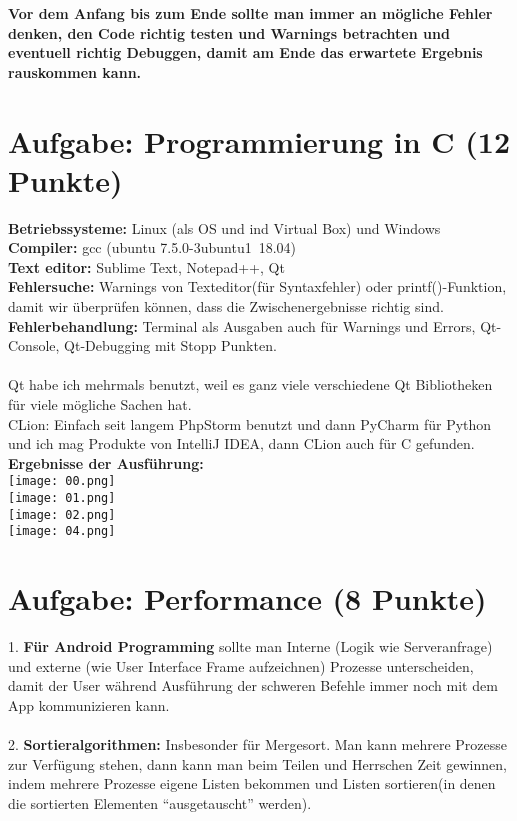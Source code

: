  \textbf{Vor dem Anfang bis zum Ende sollte man immer an mögliche Fehler denken, den Code richtig testen und Warnings betrachten und eventuell richtig Debuggen, damit am Ende das erwartete Ergebnis rauskommen kann.}


\section{Aufgabe: Programmierung in C \hfill (12 Punkte)}
 \textbf{Betriebssysteme:} Linux (als OS und ind Virtual Box) und Windows\\
 \textbf{Compiler:} gcc (ubuntu 7.5.0-3ubuntu1~18.04)\\ 
 \textbf{Text editor:} Sublime Text, Notepad++, Qt\\
 \textbf{Fehlersuche:} Warnings von Texteditor(für Syntaxfehler) oder printf()-Funktion, damit wir überprüfen können, dass die Zwischenergebnisse richtig sind. \\
 \textbf{Fehlerbehandlung:} Terminal als Ausgaben auch für Warnings und Errors, Qt-Console, Qt-Debugging mit Stopp Punkten.\\\\

Qt habe ich mehrmals benutzt, weil es ganz viele verschiedene Qt Bibliotheken für viele mögliche Sachen hat.\\
CLion: Einfach seit langem PhpStorm benutzt und dann PyCharm für Python und ich mag Produkte von IntelliJ IDEA, dann CLion auch für C gefunden.\\

\textbf{Ergebnisse der Ausführung:}\\
\texttt{[image: 00.png]}\\
\texttt{[image: 01.png]}\\
\texttt{[image: 02.png]}\\
\texttt{[image: 04.png]}\\


\section{Aufgabe: Performance \hfill (8 Punkte)}
1. \textbf{Für Android Programming} sollte man Interne (Logik wie Serveranfrage) und externe (wie User Interface Frame aufzeichnen) Prozesse unterscheiden, damit der User während Ausführung der schweren Befehle immer noch mit dem App kommunizieren kann.\\\\
2. \textbf{Sortieralgorithmen:} Insbesonder für Mergesort. Man kann mehrere Prozesse zur Verfügung stehen, dann kann man beim Teilen und Herrschen Zeit gewinnen, indem mehrere Prozesse eigene Listen bekommen und Listen sortieren(in denen die sortierten Elementen “ausgetauscht” werden).



